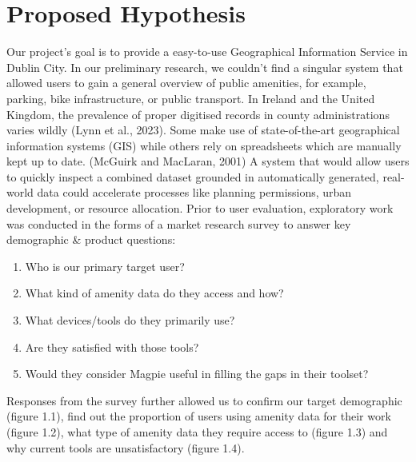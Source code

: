 \documentclass{report}
\begin{document}
\section{Proposed Hypothesis}
Our project's goal is to provide a easy-to-use Geographical Information Service
in Dublin City. In our preliminary research, we couldn’t find a singular
system that allowed users to gain a general overview of public amenities, for
example, parking, bike infrastructure, or public transport. In Ireland and the
United Kingdom, the prevalence of proper digitised records in county
administrations varies wildly (Lynn et al., 2023). Some make use of
state-of-the-art geographical information systems (GIS) while others rely on
spreadsheets which are manually kept up to date. (McGuirk and MacLaran, 2001) A
system that would allow users to quickly inspect a combined dataset grounded in
automatically generated, real-world data could accelerate processes like planning permissions, urban development, or resource allocation.
Prior to user evaluation, exploratory work was conducted in the forms of a
market research survey to answer key demographic \& product questions:
\begin{enumerate}
    \item Who is our primary target user?
    \item What kind of amenity data do they access and how?
    \item What devices/tools do they primarily use?
    \item Are they satisfied with those tools?
    \item Would they consider Magpie useful in filling the gaps in their
          toolset?
\end{enumerate}
Responses from the survey further allowed us to confirm our target demographic
(figure 1.1), find out the proportion of users using amenity data for their work
(figure 1.2), what type of amenity data  they require access to (figure 1.3) and
why current tools are unsatisfactory (figure 1.4).
\end{document}

